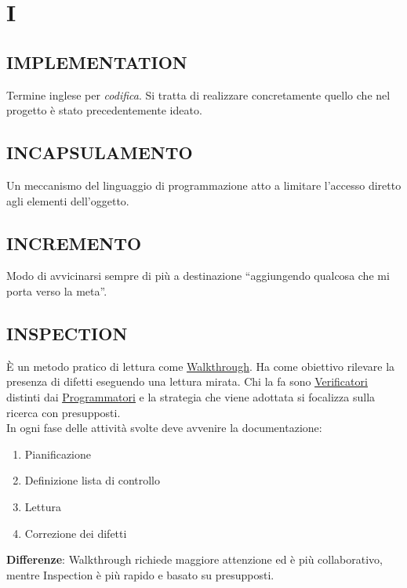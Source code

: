 \newpage
	\section{I} \label{sec:I}


		\subsection{IMPLEMENTATION}  \label{implementation}
		Termine inglese per \textit{codifica}. Si tratta di realizzare concretamente quello che nel progetto è stato precedentemente ideato.


		\subsection{INCAPSULAMENTO}  \label{incapsulamento}
		Un meccanismo del linguaggio di programmazione atto a limitare l'accesso diretto agli elementi dell'oggetto.


		\subsection{INCREMENTO}  \label{incremento}
		Modo di avvicinarsi sempre di più a destinazione ``aggiungendo qualcosa che mi porta verso la meta''.


		\subsection{INSPECTION}		\label{inspection}
		È un metodo pratico di lettura come \underline{\hyperref[walkthrough]{Walkthrough}}. Ha come obiettivo rilevare la presenza di difetti eseguendo una lettura mirata. Chi la fa sono \underline{\hyperref[verificatore]{Verificatori}} distinti dai \underline{\hyperref[programmatore]{Programmatori}} e la strategia che viene adottata si focalizza sulla ricerca con presupposti. \\
		In ogni fase delle attività svolte deve avvenire la documentazione:
		\begin{enumerate}
			\item Pianificazione
			\item Definizione lista di controllo
			\item Lettura
			\item Correzione dei difetti
		\end{enumerate}
		\textbf{Differenze}: Walkthrough richiede maggiore attenzione ed è più collaborativo, mentre Inspection è più rapido e basato su presupposti.


